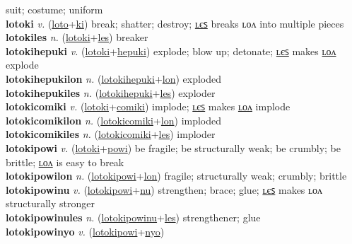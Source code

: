 suit; costume; uniform \label{lotonyolonpoltilum} \\
\textbf{lotoki} \textit{v.} (\hyperref[loto]{loto}+\hyperref[ki]{ki})
break; shatter; destroy; \hyperref[lotokiles]{ʟєꜱ} breaks ʟᴏᴧ into multiple pieces \label{lotoki} \\
\textbf{lotokiles} \textit{n.} (\hyperref[lotoki]{lotoki}+\hyperref[les]{les})
breaker \label{lotokiles} \\
\textbf{lotokihepuki} \textit{v.} (\hyperref[lotoki]{lotoki}+\hyperref[hepuki]{hepuki})
explode; blow up; detonate; \hyperref[lotokihepukiles]{ʟєꜱ} makes \hyperref[lotokihepukilon]{ʟᴏᴧ} explode \label{lotokihepuki} \\
\textbf{lotokihepukilon} \textit{n.} (\hyperref[lotokihepuki]{lotokihepuki}+\hyperref[lon]{lon})
exploded \label{lotokihepukilon} \\
\textbf{lotokihepukiles} \textit{n.} (\hyperref[lotokihepuki]{lotokihepuki}+\hyperref[les]{les})
exploder \label{lotokihepukiles} \\
\textbf{lotokicomiki} \textit{v.} (\hyperref[lotoki]{lotoki}+\hyperref[comiki]{comiki})
implode; \hyperref[lotokicomikiles]{ʟєꜱ} makes \hyperref[lotokicomikilon]{ʟᴏᴧ} implode \label{lotokicomiki} \\
\textbf{lotokicomikilon} \textit{n.} (\hyperref[lotokicomiki]{lotokicomiki}+\hyperref[lon]{lon})
imploded \label{lotokicomikilon} \\
\textbf{lotokicomikiles} \textit{n.} (\hyperref[lotokicomiki]{lotokicomiki}+\hyperref[les]{les})
imploder \label{lotokicomikiles} \\
\textbf{lotokipowi} \textit{v.} (\hyperref[lotoki]{lotoki}+\hyperref[powi]{powi})
be fragile; be structurally weak; be crumbly; be brittle; \hyperref[lotokipowilon]{ʟᴏᴧ} is easy to break \label{lotokipowi} \\
\textbf{lotokipowilon} \textit{n.} (\hyperref[lotokipowi]{lotokipowi}+\hyperref[lon]{lon})
fragile; structurally weak; crumbly; brittle \label{lotokipowilon} \\
\textbf{lotokipowinu} \textit{v.} (\hyperref[lotokipowi]{lotokipowi}+\hyperref[nu]{nu})
strengthen; brace; glue; \hyperref[lotokipowinules]{ʟєꜱ} makes ʟᴏᴧ structurally stronger \label{lotokipowinu} \\
\textbf{lotokipowinules} \textit{n.} (\hyperref[lotokipowinu]{lotokipowinu}+\hyperref[les]{les})
strengthener; glue \label{lotokipowinules} \\
\textbf{lotokipowinyo} \textit{v.} (\hyperref[lotokipowi]{lotokipowi}+\hyperref[nyo]{nyo})
